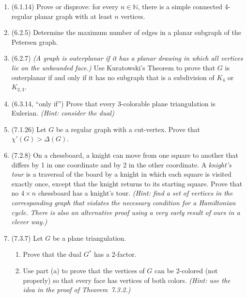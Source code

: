 \documentclass[11pt]{amsart}%
\begin{document}
\begin{enumerate}
\item (6.1.14) Prove or disprove: for every $n\in\mathbb{N}$, there is a simple connected 4-regular planar graph with at least $n$ vertices.

\item (6.2.5) Determine the maximum number of edges in a planar subgraph of the Petersen graph.

\item (6.2.7) \textit{(A graph is \emph{outerplanar} if it has a planar drawing in which all vertices lie on the unbounded face.)}  Use Kuratowski's Theorem to prove that $G$ is outerplanar if and only if it has no subgraph that is a subdivision of $K_4$ or $K_{2,3}$.

\item (6.3.14, ``only if'') Prove that every 3-colorable plane triangulation is Eulerian.  \textit{(Hint: consider the dual)}


\item (7.1.26) Let $G$ be a regular graph with a cut-vertex.  Prove that $\chi'(G)>\Delta(G)$.

\item (7.2.8) On a chessboard, a knight can move from one square to another that differs by 1 in one coordinate and by 2 in the other coordinate.  A \emph{knight's tour} is a traversal of the board by a knight in which each square is visited exactly once, except that the knight returns to its starting square.  Prove that no $4\times n$ chessboard has a knight's tour.  \textit{(Hint: find a set of vertices in the corresponding graph that violates the necessary condition for a Hamiltonian cycle.  There is also an alternative proof using a very early result of ours in a clever way.)}


\item (7.3.7) Let $G$ be a plane triangulation.
\begin{enumerate}
\item Prove that the dual $G^*$ has a 2-factor.
\item Use part (a) to prove that the vertices of $G$ can be 2-colored (not properly) so that every face has vertices of both colors.  \textit{(Hint: use the idea in the proof of Theorem~7.3.2.)}
\end{enumerate}

\end{enumerate}
\end{document}
